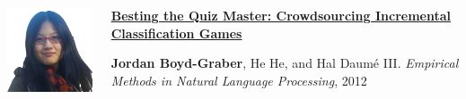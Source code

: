 \documentclass[xcolor=dvipsnames]{beamer}
\begin{document}
\begin{frame}{}

  \begin{columns}
        \includegraphics[width=0.7\linewidth]{general_figures/hehe}
        \begin{block}{{\bf
              \href{http://cs.colorado.edu/~jbg//docs/qb_emnlp_2012.pdf}{Besting
                the Quiz Master: Crowdsourcing Incremental
                Classification Games}}}

          {\bf Jordan Boyd-Graber}, He He, and Hal {Daum\'{e} III}. \emph{Empirical Methods in Natural Language Processing}, 2012
        \end{block}
  \end{columns}
\end{frame}
\end{document}
